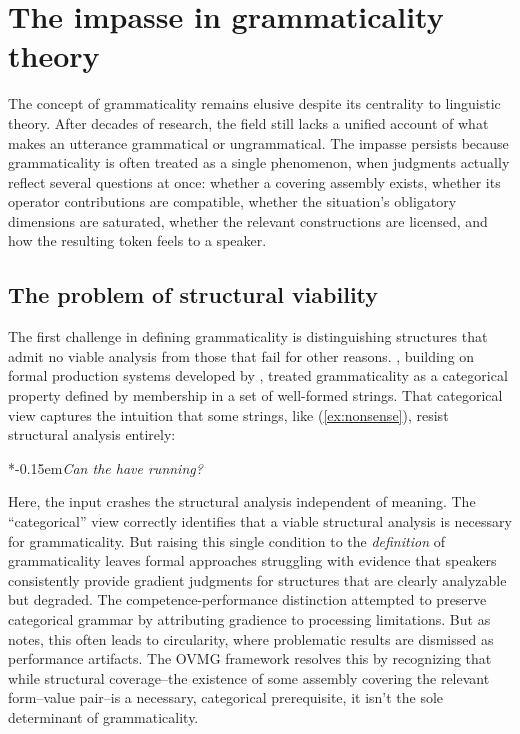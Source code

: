 \documentclass[12pt,letterpaper]{article}
\newcommand{\mention}[1]{\textit{#1}}
\newcommand{\judgesep}{\kern-0.15em}
\newcommand{\ungram}[1]{*\judgesep#1}
\begin{document}
\section{The impasse in grammaticality theory}\label{sec:previous}

The concept of grammaticality remains elusive despite its centrality to linguistic theory. After decades of research, the field still lacks a unified account of what makes an utterance grammatical or ungrammatical. The impasse persists because grammaticality is often treated as a single phenomenon, when judgments actually reflect several questions at once: whether a covering assembly exists, whether its operator contributions are compatible, whether the situation's obligatory dimensions are saturated, whether the relevant constructions are licensed, and how the resulting token feels to a speaker.

\subsection{The problem of structural viability}\label{sec:impasse-viability}

The first challenge in defining grammaticality is distinguishing structures that admit no viable analysis from those that fail for other reasons. \textcite{chomsky1957}, building on formal production systems developed by \textcite{post1943}, treated grammaticality as a categorical property defined by membership in a set of well-formed strings. That categorical view captures the intuition that some strings, like (\ref{ex:nonsense}), resist structural analysis entirely:

\ea
\ungram{\mention{Can the have running?}}
\z

Here, the input crashes the structural analysis independent of meaning. The \enquote{categorical} view correctly identifies that a viable structural analysis is necessary for grammaticality. But raising this single condition to the \emph{definition} of grammaticality leaves formal approaches struggling with evidence that speakers consistently provide gradient judgments for structures that are clearly analyzable but degraded. The competence-performance distinction \autocite{chomsky1965} attempted to preserve categorical grammar by attributing gradience to processing limitations. But as \textcite[71]{schutze2016} notes, this often leads to circularity, where problematic results are dismissed as performance artifacts. The OVMG framework resolves this by recognizing that while structural coverage--the existence of some assembly covering the relevant form--value pair--is a necessary, categorical prerequisite, it isn't the sole determinant of grammaticality.
\end{document}
